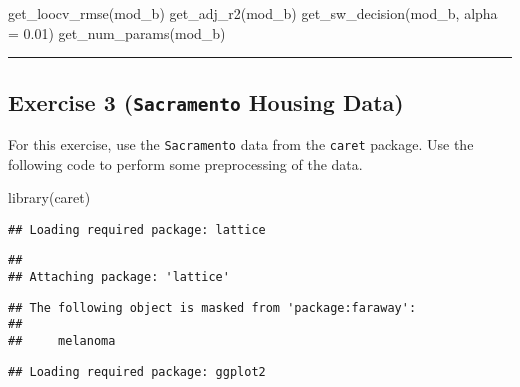 \documentclass[
]{article}
\newenvironment{Shaded}{\begin{snugshade}}{\end{snugshade}}
\newcommand{\AttributeTok}[1]{\textcolor[rgb]{0.77,0.63,0.00}{#1}}
\newcommand{\FloatTok}[1]{\textcolor[rgb]{0.00,0.00,0.81}{#1}}
\newcommand{\FunctionTok}[1]{\textcolor[rgb]{0.00,0.00,0.00}{#1}}
\newcommand{\NormalTok}[1]{#1}
\newcommand{\OtherTok}[1]{\textcolor[rgb]{0.56,0.35,0.01}{#1}}
\newcommand{\SpecialCharTok}[1]{\textcolor[rgb]{0.00,0.00,0.00}{#1}}
\newcommand{\StringTok}[1]{\textcolor[rgb]{0.31,0.60,0.02}{#1}}
\begin{document}
\begin{Shaded}
\begin{Highlighting}[]
\FunctionTok{get\_loocv\_rmse}\NormalTok{(mod\_b)}
\FunctionTok{get\_adj\_r2}\NormalTok{(mod\_b)}
\FunctionTok{get\_sw\_decision}\NormalTok{(mod\_b, }\AttributeTok{alpha =} \FloatTok{0.01}\NormalTok{)}
\FunctionTok{get\_num\_params}\NormalTok{(mod\_b)}
\end{Highlighting}
\end{Shaded}

\begin{center}\rule{0.5\linewidth}{0.5pt}\end{center}

\hypertarget{exercise-3-sacramento-housing-data}{%
\subsection{\texorpdfstring{Exercise 3 (\texttt{Sacramento} Housing
Data)}{Exercise 3 (Sacramento Housing Data)}}\label{exercise-3-sacramento-housing-data}}

For this exercise, use the \texttt{Sacramento} data from the
\texttt{caret} package. Use the following code to perform some
preprocessing of the data.

\begin{Shaded}
\begin{Highlighting}[]
\FunctionTok{library}\NormalTok{(caret)}
\end{Highlighting}
\end{Shaded}

\begin{verbatim}
## Loading required package: lattice
\end{verbatim}

\begin{verbatim}
## 
## Attaching package: 'lattice'
\end{verbatim}

\begin{verbatim}
## The following object is masked from 'package:faraway':
## 
##     melanoma
\end{verbatim}

\begin{verbatim}
## Loading required package: ggplot2
\end{verbatim}

\begin{Shaded}
\end{Shaded}
\end{document}
